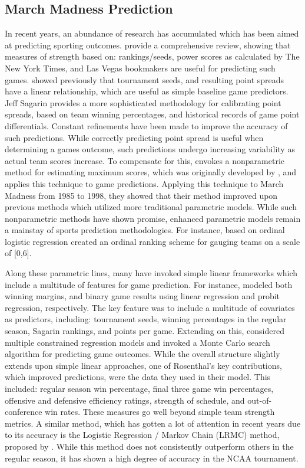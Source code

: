 \documentclass[letterpaper,12pt]{article}
\begin{document}
\subsection{March Madness Prediction \label{methods_review}}
In recent years, an abundance of research has accumulated which has been aimed at predicting sporting outcomes. \cite{boulier2003predicting} provide a comprehensive review, showing that measures of strength based on:  rankings/seeds, power scores as calculated by The New York Times,  and Las Vegas bookmakers are useful for predicting such games. \cite{smith1999can} showed previously that tournament seeds, and resulting point spreads have a linear relationship, which are useful as simple baseline game predictors. Jeff Sagarin \citep{sagarin} provides a more sophisticated methodology for calibrating point spreads, based on team winning percentages, and historical records of game point differentials. 
Constant refinements have been made to improve the accuracy of such predictions. While correctly predicting point spread is useful when determining a games outcome, such predictions undergo increasing variability as actual team scores increase. To compensate for this, 
\cite{caudill2003predicting} envokes a nonparametric method for estimating maximum scores, which was originally developed by \cite{manski1977estimation}, and applies this technique to game predictions.
Applying this technique to March Madness from 1985 to 1998, they showed that their method improved upon previous methods which utilized more traditional parametric models. While such nonparametric methods have shown promise, enhanced parametric models remain a mainstay of sports prediction methodologies. For instance, based on ordinal logistic regression \cite{west2006simple} created an ordinal ranking scheme for gauging teams on a scale of [0,6]. 

Along these parametric lines, many have invoked simple linear frameworks which include a multitude of features for game prediction. For instance, \cite{wright2012statistical} modeled both winning margins, and binary game results using linear regression and probit regression, respectively. The key feature was to include a multitude of covariates as predictors, including: tournament seeds, winning percentages in the regular season, Sagarin rankings, and points per game. Extending on this, 
\cite{rosenthal} considered multiple constrained regression models and invoked a Monte Carlo search algorithm for predicting game outcomes. While the overall structure slightly extends upon simple linear approaches, one of Rosenthal's key contributions, which improved predictions, were the data they used in their model. This included: regular season win percentage, final three game win percentages, offensive and defensive efficiency ratings, strength of schedule, and out-of-conference win rates. These measures go well beyond simple team strength metrics. A similar method, which has gotten a lot of attention in recent years due to its accuracy is the Logistic Regression / Markov Chain (LRMC) method, proposed by \cite{Kvam2006}. While this method does not consistently outperform others in the regular season, it has shown a high degree of accuracy in the NCAA tournament.
\end{document}
